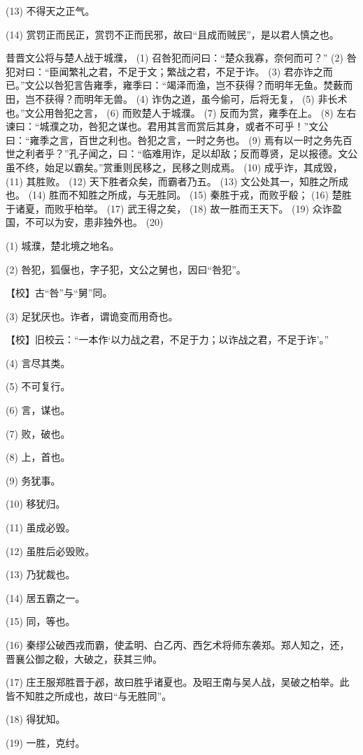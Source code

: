 \documentclass[12pt,UTF8]{ctexbook}
\begin{document}
(13) 不得天之正气。

(14) 赏罚正而民正，赏罚不正而民邪，故曰“且成而贼民”，是以君人慎之也。

昔晋文公将与楚人战于城濮， (1) 召咎犯而问曰：“楚众我寡，奈何而可？” (2) 咎犯对曰：“臣闻繁礼之君，不足于文；繁战之君，不足于诈。 (3) 君亦诈之而已。”文公以咎犯言告雍季，雍季曰：“竭泽而渔，岂不获得？而明年无鱼。焚薮而田，岂不获得？而明年无兽。 (4) 诈伪之道，虽今偷可，后将无复， (5) 非长术也。”文公用咎犯之言， (6) 而败楚人于城濮。 (7) 反而为赏，雍季在上。 (8) 左右谏曰：“城濮之功，咎犯之谋也。君用其言而赏后其身，或者不可乎！”文公曰：“雍季之言，百世之利也。咎犯之言，一时之务也。 (9) 焉有以一时之务先百世之利者乎？”孔子闻之，曰：“临难用诈，足以却敌；反而尊贤，足以报德。文公虽不终，始足以霸矣。”赏重则民移之，民移之则成焉。 (10) 成乎诈，其成毁， (11) 其胜败。 (12) 天下胜者众矣，而霸者乃五。 (13) 文公处其一，知胜之所成也。 (14) 胜而不知胜之所成，与无胜同。 (15) 秦胜于戎，而败乎殽； (16) 楚胜于诸夏，而败乎柏举。 (17) 武王得之矣， (18) 故一胜而王天下。 (19) 众诈盈国，不可以为安，患非独外也。 (20)

(1) 城濮，楚北境之地名。

(2) 咎犯，狐偃也，字子犯，文公之舅也，因曰“咎犯”。

【校】古“咎”与“舅”同。

(3) 足犹厌也。诈者，谓诡变而用奇也。

【校】旧校云：“一本作‘以力战之君，不足于力；以诈战之君，不足于诈’。”

(4) 言尽其类。

(5) 不可复行。

(6) 言，谋也。

(7) 败，破也。

(8) 上，首也。

(9) 务犹事。

(10) 移犹归。

(11) 虽成必毁。

(12) 虽胜后必毁败。

(13) 乃犹裁也。

(14) 居五霸之一。

(15) 同，等也。

(16) 秦缪公破西戎而霸，使孟明、白乙丙、西乞术将师东袭郑。郑人知之，还，晋襄公御之殽，大破之，获其三帅。

(17) 庄王服郑胜晋于邲，故曰胜乎诸夏也。及昭王南与吴人战，吴破之柏举。此皆不知胜之所成也，故曰“与无胜同”。

(18) 得犹知。

(19) 一胜，克纣。
\end{document}
